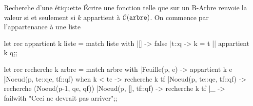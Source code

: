 \begin{question}{Recherche d’une étiquette}{}
Écrire une fonction  telle que  sur un B-Arbre  renvoie la valeur  si et seulement si $k$ appartient à ${\cal C}(\texttt{arbre})$.
\reponse
On commence par l'appartenance à une liste
\begin{ocaml}
let rec appartient k liste = 
   match liste with
   |[] -> false
   |t::q -> k = t || appartient k q;;
\end{ocaml}

\begin{ocaml}
let rec recherche k arbre =
   match arbre with
   |Feuille(p, e) -> appartient k e
   |Noeud(p, te::qe, tf::qf) when k < te -> recherche k tf
   |Noeud(p, te::qe, tf::qf) -> recherche (Noeud(p-1, qe, qf))
   |Noeud(p, [], tf::qf) -> recherche k tf
   |_ -> failwith "Ceci ne devrait pas arriver";;
\end{ocaml}
\end{question}
